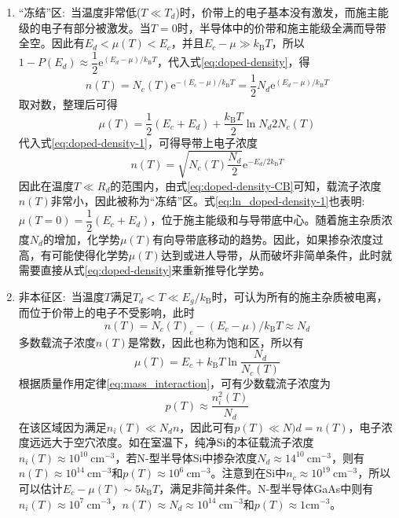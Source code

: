 \begin{enumerate}
	\item ``冻结''区:~当温度非常低($T\ll T_d$)时，价带上的电子基本没有激发，而施主能级的电子有部分被激发。当$T=0$时，半导体中的价带和施主能级全满而导带全空。因此有$E_d<\!\mu(T)\!<E_c$，并且$E_c-\mu\gg k_{\mathrm{B}}T$，所以$1-P(E_d)\approx\dfrac12\mathrm{e}^{(E_d-\mu)/k_{\mathrm{B}}T}$，代入式\eqref{eq:doped-density}，得
		\begin{equation}
			n(T)=N_c(T)\mathrm{e}^{-(E_c-\mu)/k_{\mathrm{B}}T}=\dfrac12N_d\mathrm{e}^{(E_d-\mu)/k_{\mathrm{B}}T}
			\label{eq:doped-density-1}
		\end{equation}
取对数，整理后可得
\begin{equation}
	\mu(T)=\dfrac12(E_c+E_d)+\dfrac{k_{\mathrm{B}}T}2\ln{N_d}{2N_c(T)}
	\label{eq:ln_doped-density-1}
\end{equation}
代入式\eqref{eq:doped-density-1}，可得导带上电子浓度
\begin{equation}
	n(T)=\sqrt{N_c(T)\dfrac{N_d}2}\mathrm{e}^{-E_d/2k_{\mathrm{B}}T}
	\label{eq:doped-density-CB}
\end{equation}
因此在温度$T\ll R_d$的范围内，由式\eqref{eq:doped-density-CB}可知，载流子浓度$n(T)$非常小，因此被称为``冻结''区。式\eqref{eq:ln_doped-density-1}也表明:~$\mu(T=0)=\dfrac12(E_c+E_d)$，位于施主能级和与导带底中心。随着施主杂质浓度$N_d$的增加，化学势$\mu(T)$有向导带底移动的趋势。因此，如果掺杂浓度过高，有可能使得化学势$\mu(T)$达到或进人导带，从而破坏非简单条件，此时就需要直接从式\eqref{eq:doped-density}来重新推导化学势。

\item 非本征区:~当温度$T$满足$T_d<T\ll E_g/k_{\mathrm{B}}$时，可认为所有的施主杂质被电离，而位于价带上的电子不受影响，此时
	\begin{equation}
		n(T)=N_c(T)_{e}-(E_c-\mu)/k_{\mathrm{B}}T\approx N_d
		\label{eq:uninstriic_nT}
	\end{equation}
多数载流子浓度$n(T)$是常数，因此也称为饱和区，所以有
\begin{equation}
	\mu(T)=E_c+k_{\mathrm{B}}T\ln\dfrac{N_d}{N_c(T)}
	\label{eq:uninstric_chemical-potential}
\end{equation}
根据质量作用定律\eqref{eq:mass_interaction}，可有少数载流子浓度为
\begin{equation}
	p(T)\approx\dfrac{n_i^2(T)}{N_d}
	\label{eq:uninstric-p_T}
\end{equation}
在该区域因为满足$n_i(T)\ll N_dn$，因此可有$p(T)\ll N)d=n(T)$，电子浓度远远大于空穴浓度。如在室温下，纯净Si的本征载流子浓度$n_i(T)\approx10^{10}~\mathrm{cm}^{-3}$，若N-型半导体Si中掺杂浓度$N_d\approx14^{10}~\mathrm{cm}^{-3}$，则有$n(T)\approx10^{14}~\mathrm{cm}^{-3}$和$p(T)\approx10^{6}~\mathrm{cm}^{-3}$。注意到在Si中$n_c\approx10^{19}~\mathrm{cm}^{-3}$，所以可以估计$E_c-\mu(T)\sim5k_{\mathrm{B}}T$，满足非简并条件。N-型半导体GaAs中则有$n_i(T)\approx10^{7}~\mathrm{cm}^{-3}$，$n(T)\approx N_d\approx10^{14}~\mathrm{cm}^{-3}$和$p(T)\approx1\mathrm{cm}^{-3}$。


\end{enumerate}

